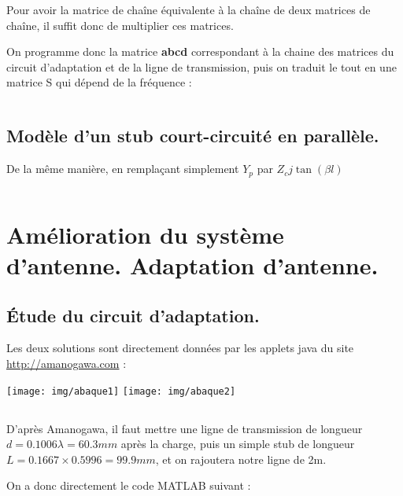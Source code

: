\documentclass[10pt]{article}
\begin{document}
\begin{itemize}
        Pour avoir la matrice de chaîne équivalente à la chaîne de deux matrices de chaîne, il suffit donc de multiplier ces matrices.

        On programme donc la matrice \textbf{abcd} correspondant à la chaine des matrices du circuit d'adaptation et de la ligne de transmission, puis on traduit le tout en une matrice S qui dépend de la fréquence : 

        \inputminted[linenos,firstline=32,firstnumber=32,lastline=49]{matlab}{src/BE.m}


\end{itemize}

\subsection{Modèle d'un stub court-circuité en parallèle.}
De la même manière, en remplaçant simplement $Y_p$ par $Z_c j \tan(\beta l)$

\inputminted[linenos,firstline=50,firstnumber=50]{matlab}{src/BE.m}


\section{Amélioration du système d'antenne. Adaptation d'antenne.}
\subsection{Étude du circuit d'adaptation.}
Les deux solutions sont directement données par les applets java du site \url{http://amanogawa.com} :

\begin{center}
    \texttt{[image: img/abaque1]}
    \texttt{[image: img/abaque2]}
\end{center}
\subsection{}

D'après Amanogawa, il faut mettre une ligne de transmission de longueur $d=0.1006 \lambda = 60.3mm$ après la charge, puis un simple stub de longueur $L=0.1667\times 0.5996=99.9mm$, et on rajoutera notre ligne de 2m.

On a donc directement le code MATLAB suivant :

\inputminted[linenos]{matlab}{src/2b.m}
\end{document}
